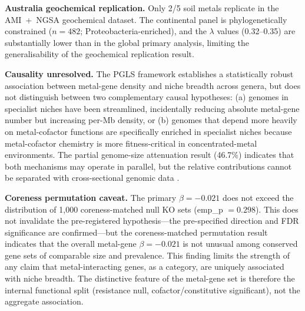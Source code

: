 \documentclass[times]{zHenriquesLab-StyleBioRxiv}
\begin{document}
\textbf{Australia geochemical replication.} Only 2/5 soil metals replicate in the
AMI~+~NGSA geochemical dataset. The continental panel is
phylogenetically constrained ($n = 482$; Proteobacteria-enriched), and the
$\lambda$ values (0.32--0.35) are substantially lower than in the global primary
analysis, limiting the generalisability of the geochemical replication result.

\textbf{Causality unresolved.} The PGLS framework establishes a statistically
robust association between metal-gene density and niche breadth across genera,
but does not distinguish between two complementary causal hypotheses: (a) genomes
in specialist niches have been streamlined, incidentally reducing absolute
metal-gene number but increasing per-Mb density, or (b) genomes that depend more
heavily on metal-cofactor functions are specifically enriched in specialist niches
because metal-cofactor chemistry is more fitness-critical in
concentrated-metal environments. The partial genome-size attenuation result
(46.7\%) indicates that both mechanisms may operate in parallel, but the relative
contributions cannot be separated with cross-sectional genomic data
.

\textbf{Coreness permutation caveat.} The primary $\beta = -0.021$ does not
exceed the distribution of 1,000 coreness-matched null KO sets (emp\_p $=
0.298$). This does not invalidate the pre-registered hypothesis---the pre-specified direction and FDR
significance are confirmed---but the coreness-matched permutation result
indicates that the overall metal-gene $\beta = -0.021$ is not unusual among
conserved gene sets of comparable size and prevalence. This finding limits the
strength of any claim that metal-interacting genes, as a category, are uniquely
associated with niche breadth. The distinctive feature of the metal-gene set
is therefore the internal functional split (resistance null, cofactor/constitutive
significant), not the aggregate association.
\end{document}
